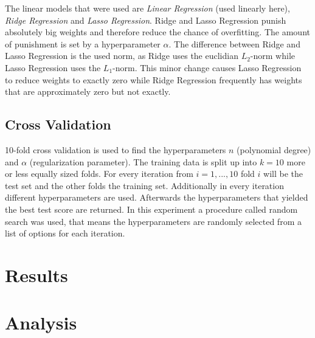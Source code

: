 \documentclass[notitlepage]{article}
\begin{document}
    The linear models that were used are \textit{Linear Regression} (used linearly here), 
    \textit{Ridge Regression} and 
    \textit{Lasso Regression}. Ridge and Lasso Regression punish absolutely big weights and 
    therefore reduce the chance of overfitting. The amount of punishment is set by a hyperparameter 
    $\alpha$. The difference between Ridge and Lasso Regression is the used norm, as Ridge uses 
    the euclidian $L_2$-norm while Lasso Regression uses the $L_1$-norm. This minor change causes 
    Lasso Regression to reduce weights to exactly zero while Ridge Regression frequently has 
    weights that are approximately zero but not exactly.
    \subsection{Cross Validation}
    10-fold cross validation is used to find the hyperparameters $n$ (polynomial degree) and 
    $\alpha$ (regularization parameter). The training data is split up into $k=10$ more or less 
    equally sized folds. For every iteration from $i=1,...,10$ fold $i$ will be the test set and 
    the other folds the training set. Additionally in every iteration different hyperparameters are 
    used. Afterwards the hyperparameters that yielded the best test score are returned. In this 
    experiment a procedure called random search was used, that means the hyperparameters are 
    randomly selected from a list of options for each iteration. 
    \section{Results}
    \section{Analysis}
\end{document}
